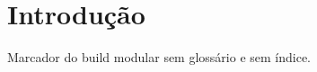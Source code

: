 \documentclass{ufctex}
\begin{document}
\textual
\section{Introdução}
Marcador do build modular sem glossário e sem índice.
\end{document}
